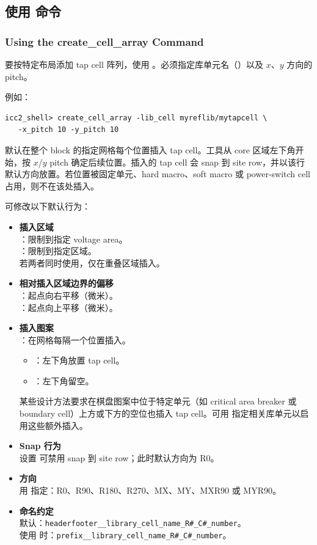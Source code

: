 \subsection{使用  命令}
\subsubsection*{Using the create\_cell\_array Command}

要按特定布局添加 tap cell 阵列，使用 。必须指定库单元名（）以及 $x$、$y$ 方向的 pitch。

例如：
\begin{lstlisting}
icc2_shell> create_cell_array -lib_cell myreflib/mytapcell \
   -x_pitch 10 -y_pitch 10
\end{lstlisting}

默认在整个 block 的指定网格每个位置插入 tap cell。工具从 core 区域左下角开始，按 $x$/$y$ pitch 确定后续位置。插入的 tap cell 会 snap 到 site row，并以该行默认方向放置。若位置被固定单元、hard macro、soft macro 或 power-switch cell 占用，则不在该处插入。

可修改以下默认行为：
\begin{itemize}
  \item \textbf{插入区域}\\
        ：限制到指定 voltage area。\\
        ：限制到指定区域。\\
        若两者同时使用，仅在重叠区域插入。
  \item \textbf{相对插入区域边界的偏移}\\
        ：起点向右平移（微米）。\\
        ：起点向上平移（微米）。
  \item \textbf{插入图案}\\
        ：在网格每隔一个位置插入。
        \begin{itemize}
          \item {}：左下角放置 tap cell。
          \item {}：左下角留空。
        \end{itemize}
        某些设计方法要求在棋盘图案中位于特定单元（如 critical area breaker 或 boundary cell）上方或下方的空位也插入 tap cell。可用  指定相关库单元以启用这些额外插入。
  \item \textbf{Snap 行为}\\
        设置  可禁用 snap 到 site row；此时默认方向为 R0。
  \item \textbf{方向}\\
        用  指定：R0、R90、R180、R270、MX、MY、MXR90 或 MYR90。
  \item \textbf{命名约定}\\
        默认：\texttt{headerfooter\_\_library\_cell\_name\_R\#\_C\#\_number}。\\
        使用 \opt{-prefix} 时：\texttt{prefix\_\_library\_cell\_name\_R\#\_C\#\_number}。
\end{itemize}

